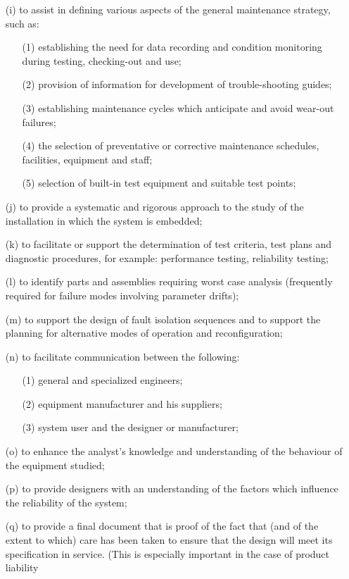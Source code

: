 \documentclass[./dissertation.tex]{subfiles}
\begin{document}
\begin{enumerate}
\item[(i)] to assist in defining various aspects of the general maintenance strategy, such as:
\begin{enumerate}
\item[(1)] establishing the need for data recording and condition monitoring during testing, checking-out and use;
\item[(2)] provision of information for development of trouble-shooting guides;
\item[(3)] establishing maintenance cycles which anticipate and avoid wear-out failures;
\item[(4)] the selection of preventative or corrective maintenance schedules, facilities, equipment and staff;
\item[(5)] selection of built-in test equipment and suitable test points;
\end{enumerate}
\item[(j)] to provide a systematic and rigorous approach to the study of the installation in which the system is embedded;
\item[(k)] to facilitate or support the determination of test criteria, test plans and diagnostic procedures, for example: performance testing, reliability testing;
\item[(l)] to identify parts and assemblies requiring worst case analysis (frequently required for failure modes involving parameter drifts);
\item[(m)] to support the design of fault isolation sequences and to support the planning for alternative modes of operation and reconfiguration;
\item[(n)] to facilitate communication between the following:
\begin{enumerate}
\item[(1)] general and specialized engineers;
\item[(2)] equipment manufacturer and his suppliers;
\item[(3)] system user and the designer or manufacturer;
\end{enumerate}
\item[(o)] to enhance the analyst's knowledge and understanding of the behaviour of the equipment studied;
\item[(p)] to provide designers with an understanding of the factors which influence the reliability of the system;
\item[(q)] to provide a final document that is proof of the fact that (and of the extent to which) care has been taken to ensure that the design will meet its specification in service. (This is especially important in the case of product liability 
\end{enumerate}
\end{document}
